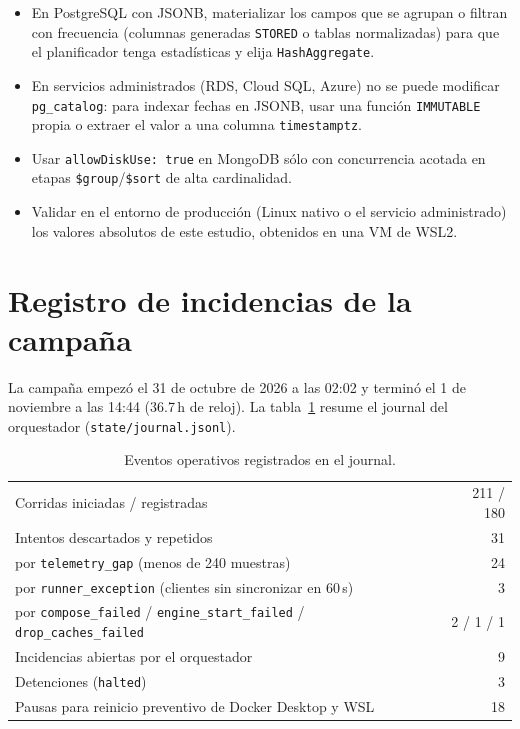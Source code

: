 \documentclass[11pt,a4paper]{article}
\begin{document}
\begin{itemize}
  \item En PostgreSQL con JSONB, materializar los campos que se agrupan o filtran con frecuencia (columnas generadas \texttt{STORED} o tablas normalizadas) para que el planificador tenga estadísticas y elija \texttt{HashAggregate}.
  \item En servicios administrados (RDS, Cloud SQL, Azure) no se puede modificar \texttt{pg\_catalog}: para indexar fechas en JSONB, usar una función \texttt{IMMUTABLE} propia o extraer el valor a una columna \texttt{timestamptz}.
  \item Usar \texttt{allowDiskUse: true} en MongoDB sólo con concurrencia acotada en etapas \texttt{\$group}/\texttt{\$sort} de alta cardinalidad.
  \item Validar en el entorno de producción (Linux nativo o el servicio administrado) los valores absolutos de este estudio, obtenidos en una VM de WSL2.
\end{itemize}

\appendix

\section{Registro de incidencias de la campaña}\label{anx:incidencias}

La campaña empezó el 31 de octubre de 2026 a las 02:02 y terminó el 1 de noviembre a las 14:44 (36.7\,h de reloj). La tabla~\ref{tab:incidencias} resume el journal del orquestador (\texttt{state/journal.jsonl}).

\begin{table}[H]
\centering\small
\caption{Eventos operativos registrados en el journal.}\label{tab:incidencias}
\begin{tabular}{lr}
\toprule
Corridas iniciadas / registradas & 211 / 180 \\
Intentos descartados y repetidos & 31 \\
\quad por \texttt{telemetry\_gap} (menos de 240 muestras) & 24 \\
\quad por \texttt{runner\_exception} (clientes sin sincronizar en 60\,s) & 3 \\
\quad por \texttt{compose\_failed} / \texttt{engine\_start\_failed} / \texttt{drop\_caches\_failed} & 2 / 1 / 1 \\
Incidencias abiertas por el orquestador & 9 \\
Detenciones (\texttt{halted}) & 3 \\
Pausas para reinicio preventivo de Docker Desktop y WSL & 18 \\
\bottomrule
\end{tabular}
\end{table}
\end{document}
